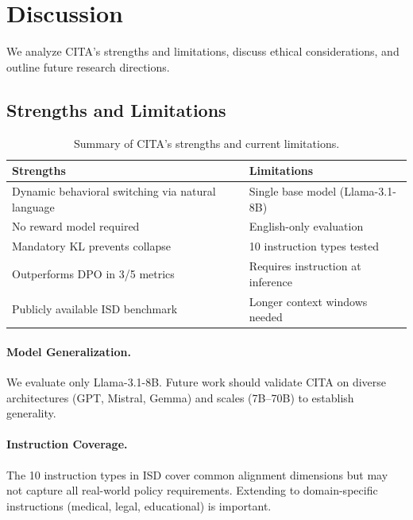 
\vspace{-2mm}
\section{Discussion}
\label{sec:discussion}

We analyze CITA's strengths and limitations, discuss ethical considerations, and outline future research directions.

\vspace{-2mm}
\subsection{Strengths and Limitations}
\label{sec:strengths_limitations}

\begin{table}[h!]
\centering
\small
\begin{tabular}{@{}p{3.8cm}p{3.8cm}@{}}
\toprule
\textbf{Strengths} & \textbf{Limitations} \\
\midrule
Dynamic behavioral switching via natural language & Single base model (Llama-3.1-8B) \\
No reward model required & English-only evaluation \\
Mandatory KL prevents collapse & 10 instruction types tested \\
Outperforms DPO in 3/5 metrics & Requires instruction at inference \\
Publicly available ISD benchmark & Longer context windows needed \\
\bottomrule
\end{tabular}
\caption{Summary of CITA's strengths and current limitations.}
\label{tab:strengths_limitations}
\vspace{-4mm}
\end{table}

\paragraph{Model Generalization.} We evaluate only Llama-3.1-8B. Future work should validate CITA on diverse architectures (GPT, Mistral, Gemma) and scales (7B--70B) to establish generality.

\paragraph{Instruction Coverage.} The 10 instruction types in ISD cover common alignment dimensions but may not capture all real-world policy requirements. Extending to domain-specific instructions (medical, legal, educational) is important.

